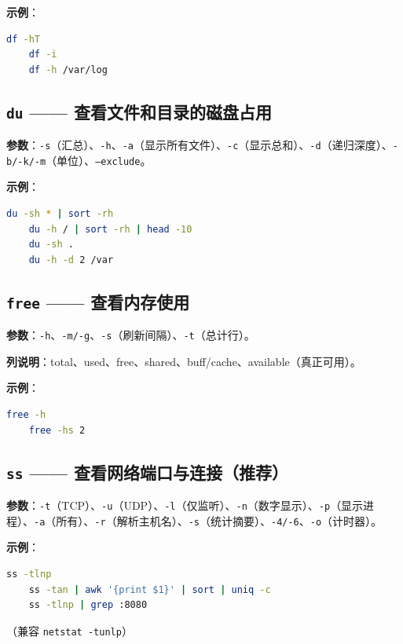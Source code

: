 \textbf{示例}：
\begin{lstlisting}[language=bash]
	df -hT
	df -i
	df -h /var/log
\end{lstlisting}

\subsection{\texttt{du} —— 查看文件和目录的磁盘占用} \textbf{参数}：\texttt{-s}（汇总）、\texttt{-h}、\texttt{-a}（显示所有文件）、\texttt{-c}（显示总和）、\texttt{-d}（递归深度）、\texttt{-b/-k/-m}（单位）、\texttt{--exclude}。

\textbf{示例}：
\begin{lstlisting}[language=bash]
	du -sh * | sort -rh
	du -h / | sort -rh | head -10
	du -sh .
	du -h -d 2 /var
\end{lstlisting}

\subsection{\texttt{free} —— 查看内存使用} \textbf{参数}：\texttt{-h}、\texttt{-m/-g}、\texttt{-s}（刷新间隔）、\texttt{-t}（总计行）。

\textbf{列说明}：total、used、free、shared、buff/cache、available（真正可用）。

\textbf{示例}：
\begin{lstlisting}[language=bash]
	free -h
	free -hs 2
\end{lstlisting}

\subsection{\texttt{ss} —— 查看网络端口与连接（推荐）} \textbf{参数}：\texttt{-t}（TCP）、\texttt{-u}（UDP）、\texttt{-l}（仅监听）、\texttt{-n}（数字显示）、\texttt{-p}（显示进程）、\texttt{-a}（所有）、\texttt{-r}（解析主机名）、\texttt{-s}（统计摘要）、\texttt{-4/-6}、\texttt{-o}（计时器）。

\textbf{示例}：
\begin{lstlisting}[language=bash]
	ss -tlnp
	ss -tan | awk '{print $1}' | sort | uniq -c
	ss -tlnp | grep :8080
\end{lstlisting}

（兼容 \texttt{netstat -tunlp}）

